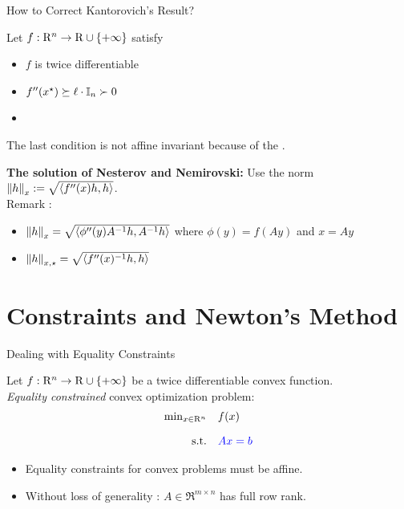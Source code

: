 \documentclass[9pt]{beamer}
\begin{document}
\begin{frame}{How to Correct Kantorovich's Result?}

  Let $f:\mathrm{R}^n\to\mathrm{R}\cup\{+\infty\}$ satisfy
  \begin{itemize}
    \setlength\itemsep{1em}
  \item $f$ is twice differentiable
  \item $f''(x^\star) \succeq \ell \cdot \mathbb I_n \succ 0$
  \item {}
  \end{itemize}
  The last condition is not affine invariant because of the .

  \vfill

  \textbf{The solution of Nesterov and Nemirovski:} Use the norm $\left\|h\right\|_x:= \sqrt{\left<f''(x) h, h\right>}$.\\[1em]

  Remark :
  \begin{itemize}
  \item $\left\|h\right\|_x = \sqrt{\left<\phi''(y) A^{-1} h, A^{-1} h\right>}$ where $\phi(y) = f(Ay)$ and $x=Ay$
  \item $\left\|h\right\|_{x, \star} = \sqrt{\left<f''(x)^{-1} h, h\right>}$
  \end{itemize}
  
  
  
\end{frame}

\section{Constraints and Newton's Method}

\begin{frame}{Dealing with Equality Constraints}

  Let $f:\mathrm{R}^n\to\mathrm{R}\cup\{+\infty\}$ be a twice differentiable convex function.\\
  \emph{Equality constrained} convex optimization problem:
  \[
    \begin{array}{rl}
      \min_{x\in\mathrm{R}^n} & f(x) \\[1em]
      \mathrm{s.t.} & {\color{blue} A x=b}
    \end{array}
  \]
  
  \begin{itemize}
  \item Equality constraints for convex problems must be affine.
  \item Without loss of generality : $A\in\Re^{m\times n}$ has full row rank.
  \end{itemize}

\end{frame}
\end{document}
